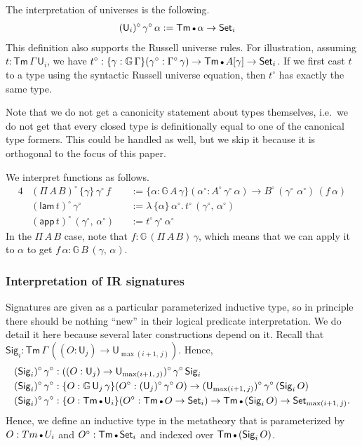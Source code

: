 \documentclass[acmsmall,screen,review,anonymous]{acmart}
\newcommand{\msf}[1]{{\mathsf{#1}}}
\newcommand{\mbb}[1]{\mathbb{#1}}
\newcommand{\U}{\msf{U}}
\newcommand{\Set}{\msf{Set}}
\newcommand{\Sig}{\msf{Sig}}
\newcommand{\emptycon}{\scaleobj{.75}\bullet}
\newcommand{\Tm}{\msf{Tm}}
\newcommand{\w}{\circ}
\newcommand{\lam}{\msf{lam}}
\newcommand{\app}{\msf{app}}
\newcommand{\G}{\mbb{G}}
\begin{document}
The interpretation of universes is the following.
\begin{alignat*}{4}
  &(\U_i)^\w\,\gamma^\w\,\alpha := \Tm\,\emptycon\,\alpha \to \Set_i
\end{alignat*}
This definition also supports the Russell universe rules. For illustration, assuming $t :
\Tm\,\Gamma\,\U_i$, we have $t^\w : \{\gamma : \G\,\Gamma\}(\gamma^\w : \Gamma^\w\,\gamma) \to
\Tm\,\emptycon\,A[\gamma] \to \Set_i$. If we first cast $t$ to a type using the syntactic Russell
universe equation, then $t^\w$ has exactly the same type.

Note that we do not get a canonicity statement about types themselves, i.e.\ we do not get that
every closed type is definitionally equal to one of the canonical type formers. This could be handled
as well, but we skip it because it is orthogonal to the focus of this paper.

We interpret functions as follows.
\begin{alignat*}{4}
  &(\Pi\,A\,B)^\w\,\{\gamma\}\,\gamma^\w\,f &&:= \{\alpha : \G\,A\,\gamma\}(\alpha^\w : A^\w\,\gamma^\w\,\alpha) \to B^\w\,(\gamma^\w\,\,\alpha^\w)\,(f\,\alpha)\\
  &(\lam\,t)^\w\,\gamma^\w &&:= \lambda\,\{\alpha\}\,\alpha^\w.\,t^\w\,(\gamma^\w,\,\alpha^\w)\\
  &(\app\,t)^\w\,(\gamma^\w,\,\alpha^\w) &&:= t^\w\,\gamma^\w\,\alpha^\w
\end{alignat*}
In the $\Pi\,A\,B$ case, note that $f : \G\,(\Pi\,A\,B)\,\gamma$, which means that we can apply it
to $\alpha$ to get $f\,\alpha : \G\,B\,(\gamma,\,\alpha)$.


\subsubsection{Interpretation of IR signatures}

Signatures are given as a particular parameterized inductive type, so in principle there should be
nothing ``new'' in their logical predicate interpretation. We do detail it here because several
later constructions depend on it. Recall that $\Sig_i : \Tm\,\Gamma\,((O : \U_j) \to \U_{\max(i+1,\,j)})$. Hence,
\begin{alignat*}{3}
  &(\Sig_i)^\w\,\gamma^\w : ((O : \U_j) \to \U_{\max(i+1,\,j)})^\w\,\gamma^\w\,\Sig_i\\
  &(\Sig_i)^\w\,\gamma^\w : \{O : \G\,\U_j\,\gamma\}(O^\w : (\U_j)^\w\,\gamma^\w\,O) \to (\U_{\max(i+1,\,j)})^\w\,\gamma^\w\,(\Sig_i\,O)\\
  &(\Sig_i)^\w\,\gamma^\w : \{O : \Tm\,\emptycon\,\U_i\}(O^\w : \Tm\,\emptycon\,O \to \Set_i) \to \Tm\,\emptycon\,(\Sig_i\,O) \to \Set_{\max(i+1,\,j)}.
\end{alignat*}
Hence, we define an inductive type in the metatheory that is parameterized by $O : Tm\,\emptycon\,U_i$ and $O^\w : \Tm\,\emptycon\,\Set_i$ and indexed
over $\Tm\,\emptycon\,(\Sig_i\,O)$.
\end{document}
